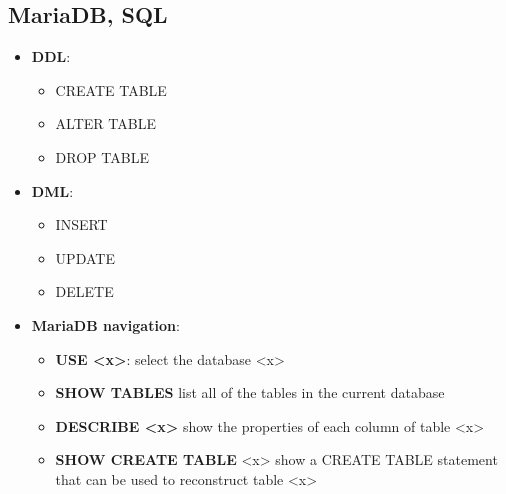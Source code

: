\documentclass{report}
\begin{document}
\begin{itemize}
    \end{itemize}

    \pagebreak 
    \subsection{MariaDB, SQL}
    \begin{itemize}
        \item \textbf{DDL}:
            \begin{itemize}
                \item CREATE TABLE
                \item ALTER TABLE
                \item DROP TABLE
            \end{itemize}
        \item \textbf{DML}:
            \begin{itemize}
                \item INSERT 
                \item UPDATE
                \item DELETE
            \end{itemize}
        \item \textbf{MariaDB navigation}:
            \begin{itemize}
                \item \textbf{USE <x>}: select the database <x>
                \item \textbf{SHOW TABLES} list all of the tables in the current database
                \item \textbf{DESCRIBE <x>} show the properties of each column of table <x>
                \item \textbf{SHOW CREATE TABLE} <x> show a CREATE TABLE statement that can be used to reconstruct table <x>
            \end{itemize}
        \end{itemize}
        \pagebreak \bigbreak \noindent 
\end{document}
